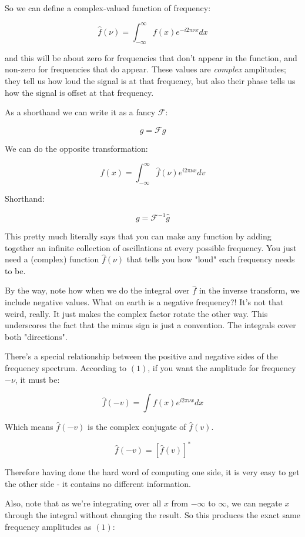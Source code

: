 So we can define a complex-valued function of frequency:

$$
\hat{f}(\nu) = \int_{-\infty}^{\infty} f(x)e^{-i2\pi\nu x} dx
\label{1}
$$

and this will be about zero for frequencies that don't appear in the function, and non-zero for frequencies that do appear. These values are \textit{complex} amplitudes; they tell us how loud the signal is at that frequency, but also their phase tells us how the signal is offset at that frequency.

As a shorthand we can write it as a fancy $\mathcal{F}$:

$$\hat{g} = \mathcal{F} g$$

We can do the opposite transformation:

$$
f(x) = \int_{-\infty}^{\infty} \hat{f}(\nu)e^{i2\pi\nu x} dv
\label{2}
$$

Shorthand:

$$g = \mathcal{F}^{-1} \hat{g}$$

This pretty much literally says that you can make any function by adding together an infinite collection of oscillations at every possible frequency. You just need a (complex) function $\hat{f}(\nu)$ that tells you how "loud" each frequency needs to be.

By the way, note how when we do the integral over $\hat{f}$ in the inverse transform, we include negative values. What on earth is a negative frequency?! It's not that weird, really. It just makes the complex factor rotate the other way. This underscores the fact that the minus sign is just a convention. The integrals cover both "directions".

There's a special relationship between the positive and negative sides of the frequency spectrum. According to $(1)$, if you want the amplitude for frequency $-\nu$, it must be:

$$
\hat{f}(-v) = \int f(x)e^{i2\pi\nu x} dx
\label{3}
$$

Which means $\hat{f}(-v)$ is the complex conjugate of $\hat{f}(v)$.

$$
\hat{f}(-v) = \left[ \hat{f}(v) \right]^*
$$

Therefore having done the hard word of computing one side, it is very easy to get the other side - it contains no different information.

Also, note that as we're integrating over all $x$ from $-\infty$ to $\infty$, we can negate $x$ through the integral without changing the result. So this produces the exact same frequency amplitudes as $(1)$:

